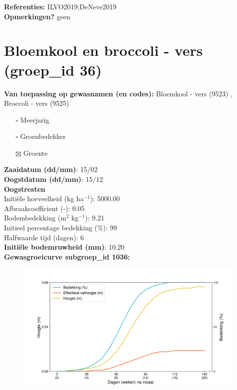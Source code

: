 \documentclass{article}
\begin{document}
  \textbf{Referenties:} ILVO2019;DeNeve2019 \vspace{0.10cm} \\ 
  \textbf{Opmerkingen?} geen \vspace{0.10cm} \\ 
 \newpage 
 \section{Bloemkool en broccoli - vers (groep\_id 36)} 
 \textbf{Van toepassing op gewasnamen (en codes):} Bloemkool - vers (9523) , Broccoli - vers (9525) 
 \begin{multicols}{3} \begin{itemize} \item[$\square$] Meerjarig \item[$\square$] Groenbedekker \item[$\boxtimes$] Groente \end{itemize} \end{multicols} 
  \textbf{Zaaidatum (dd/mm)}: 15/02  \vspace{0.10cm} \\ 
  \textbf{Oogstdatum (dd/mm)}: 15/12  \vspace{0.10cm} \\ 
  \textbf{Oogstresten} \vspace{0.05cm} \\ 
  \tab Initi\"{e}le hoeveelheid (kg ha$^{-1}$): 5000.00 \vspace{0.05cm} \\ 
  \tab Afbraakcoefficient (-): 0.05 \vspace{0.05cm} \\ 
  \tab Bodembedekking (m$^2$ kg$^{-1}$): 9.21 \vspace{0.05cm} \\ 
  \tab Initieel percentage bedekking (\%): 99 \vspace{0.05cm} \\ 
  \tab Halfwaarde tijd (dagen): 6 \vspace{0.05cm} \\ 
  \textbf{Initi\"{e}le bodemruwheid (mm)}: 10.20 \vspace{0.05cm} \\ 
  \textbf{Gewasgroeicurve subgroep\_id 1036:} 
 \begin{center} \begin{figure}[H] \includegraphics[width=12.5cm]{temp/1036.png} \end{figure} \end{center} 
\end{document}
